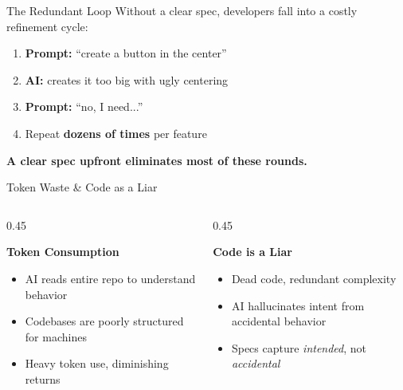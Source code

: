 \documentclass[aspectratio=169]{beamer}
\begin{document}
\begin{frame}{The Redundant Loop}
    Without a clear spec, developers fall into a costly refinement cycle:

    \vspace{0.4cm}
    \begin{enumerate}
        \item \textbf{Prompt:} ``create a button in the center''
        \item \textbf{AI:} creates it too big with ugly centering
        \item \textbf{Prompt:} ``no, I need...''
        \item Repeat \textbf{dozens of times} per feature
    \end{enumerate}

    \vspace{0.5cm}
    \colorbox{utu_green!20}{\parbox{0.9\textwidth}{
        \centering
        \textbf{A clear spec upfront eliminates most of these rounds.}
    }}
\end{frame}

\begin{frame}{Token Waste \& Code as a Liar}
    \begin{columns}[T]
        \begin{column}{0.45\textwidth}
            \colorbox{utu_blue!20}{\parbox{0.95\textwidth}{\centering\textbf{Token Consumption}}}
            \vspace{0.3cm}
            \begin{itemize}
                \item AI reads entire repo to understand behavior
                \item Codebases are poorly structured for machines
                \item Heavy token use, diminishing returns
            \end{itemize}
        \end{column}
        \begin{column}{0.45\textwidth}
            \colorbox{utu_blue!20}{\parbox{0.95\textwidth}{\centering\textbf{Code is a Liar}}}
            \vspace{0.3cm}
            \begin{itemize}
                \item Dead code, redundant complexity
                \item AI hallucinates intent from accidental behavior
                \item Specs capture \textit{intended}, not \textit{accidental}
            \end{itemize}
        \end{column}
    \end{columns}
\end{frame}
\end{document}
